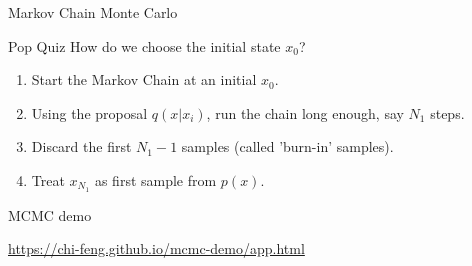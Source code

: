 \documentclass{beamer}
\begin{document}
\begin{section}{Markov Chain Monte Carlo}
    \begin{frame}{Pop Quiz}
        How do we choose the initial state $x_0$?
        \pause
        \begin{enumerate}
            \item Start the Markov Chain at an initial $x_0$.
            \item Using the proposal $q(x|x_i)$, run the chain long enough, say $N_1$ steps.
            \item Discard the first $N_1 - 1$ samples (called 'burn-in' samples).
            \item Treat $x_{N_1}$ as first sample from $p(x)$.
        \end{enumerate}
    \end{frame}

    \begin{frame}{MCMC demo}
        
        \url{https://chi-feng.github.io/mcmc-demo/app.html}
    \end{frame}
\end{section}
\end{document}
